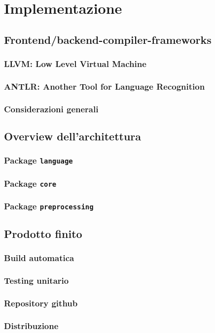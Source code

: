 \section{Implementazione}



\subsection{Frontend/backend-compiler-frameworks}
\subsubsection{LLVM: Low Level Virtual Machine}
\subsubsection{ANTLR: Another Tool for Language Recognition}
\subsubsection{Considerazioni generali}

\subsection{Overview dell'architettura}
\subsubsection{Package \texttt{language}}
\subsubsection{Package \texttt{core}}
\subsubsection{Package \texttt{preprocessing}}

\subsection{Prodotto finito}
\subsubsection{Build automatica}
\subsubsection{Testing unitario}
\subsubsection{Repository github}
\subsubsection{Distribuzione}

